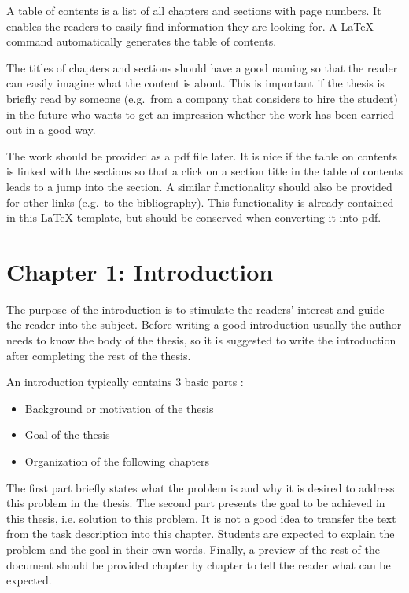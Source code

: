A table of contents is a list of all chapters and sections with page numbers. It enables the readers to easily find information they are looking for. A LaTeX command automatically generates the table of contents.

The titles of chapters and sections should have a good naming so that the reader can easily imagine what the content is about. This is important if the thesis is briefly read by someone (e.g.~from a company that considers to hire the student) in the future who wants to get an impression whether the work has been carried out in a good way.

The work should be provided as a pdf file later. It is nice if the table on contents is linked with the sections so that a click on a section title in the table of contents leads to a jump into the section. A similar functionality should also be provided for other links (e.g.~to the bibliography). This functionality is already contained in this LaTeX template, but should be conserved when converting it into pdf.

\section{Chapter 1: Introduction}

The purpose of the introduction is to stimulate the readers' interest and guide the reader into the subject. Before writing a good introduction usually the author needs to know the body of the thesis, so it is suggested to write the introduction after completing the rest of the thesis.

An introduction typically contains 3 basic parts \cite{les06}:
\begin{itemize}
\item Background or motivation of the thesis
\item Goal of the thesis
\item Organization of the following chapters 
\end{itemize}

The first part briefly states what the problem is and why it is desired to address this problem in the thesis. The second part presents the goal to be achieved in this thesis, i.e. solution to this problem. It is not a good idea to transfer the text from the task description into this chapter. Students are expected to explain the problem and the goal in their own words. Finally,  a preview of the rest of the document should be provided chapter by chapter to tell the reader what can be expected.

